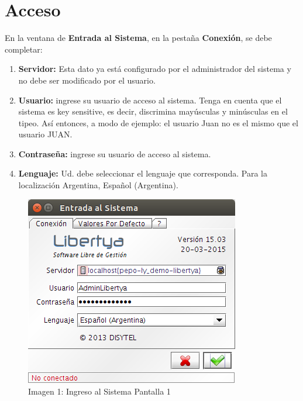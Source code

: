 \documentclass[letterpaper,10pt,spanish]{sphinxmanual}
\begin{document}
\section{Acceso}
\label{acceso:acceso}
En la ventana de \textbf{Entrada al Sistema}, en la pestaña \textbf{Conexión}, se debe completar:
\begin{enumerate}
\item {} 
\textbf{Servidor:} Esta dato ya está configurado por el administrador del sistema y no debe ser modificado por el usuario.

\item {} 
\textbf{Usuario:} ingrese su usuario de acceso al sistema. Tenga en cuenta que el sistema es key sensitive, es decir, discrimina mayúsculas y minúsculas en el tipeo. Así entonces, a modo de ejemplo: el usuario Juan no es el mismo que el usuario JUAN.

\item {} 
\textbf{Contraseña:} ingrese su usuario de acceso al sistema.

\item {} 
\textbf{Lenguaje:} Ud. debe seleccionar el lenguaje que corresponda. Para la localización Argentina, Español (Argentina).

\end{enumerate}
\begin{figure}[htbp]
\centering
\capstart

\includegraphics{ly_login.png}
\caption{Imagen 1: Ingreso al Sistema Pantalla 1}\end{figure}
\end{document}
